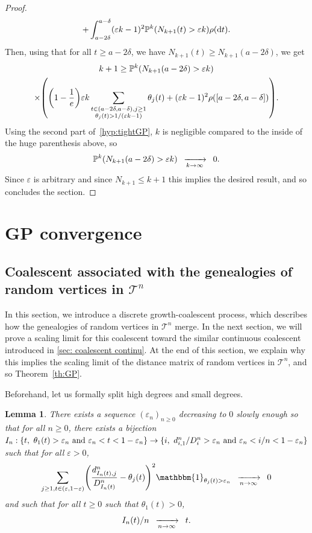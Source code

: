 \documentclass[10pt]{amsart}
\newtheorem{lemm}[theo]{Lemma}\newtheorem{prop}[theo]{Proposition}\newtheorem{coro}[theo]{Corollary}\newtheorem{conj}[theo]{Conjecture}
\theoremstyle{definition}\newtheorem{defi}[theo]{Definition}\newtheorem{rema}[theo]{Remark}\newtheorem{exam}[theo]{Example}\newtheorem{exem}[theo]{Example}\newtheorem{nota}[theo]{Notation}
\newcommand{\probak}[1]{\mathbb{P}^k\left(#1\right)}
\newcommand{\e}{\varepsilon}
\newcommand{\cv}[1][n]{\enskip\xrightarrow[#1 \to \infty]{}\enskip}
\newcommand{\rmd}{\mathrm{d}}
\newcommand{\1}{\mathbbm{1}}
\newcommand{\T}{\mathcal{T}}
\let\originalleft\left
\let\originalright\right
\renewcommand{\left}{\mathopen{}\mathclose\bgroup\originalleft}
\renewcommand{\right}{\aftergroup\egroup\originalright}
\renewcommand*{\to}{\mathchoice{\longrightarrow}{\rightarrow}{\rightarrow}{\rightarrow}}
\begin{document}
\begin{proof}
\begin{multline*}
+\int_{a-2\delta}^{a-\delta}(\e k-1)^2 \probak{N_{k+1}(t)>\e k}\rho(\rmd t).
\end{multline*}
Then, using that for all $t\geq a-2\delta$, we have $N_{k+1}(t)\geq N_{k+1}(a-2\delta)$, we get
\begin{multline*}
k+1 \geq \probak{N_{k+1}(a-2\delta)>\e k}\\
\times\left (\left(1-\frac{1}{e}\right){\e k} \sum_{\substack{ t\in (a-2\delta,a-\delta), j\geq 1 \\\theta_j(t)>1/(\e k-1) }} \theta_j(t)
+(\e k-1)^2\rho([a-2\delta,a-\delta]) \right).
\end{multline*}
Using the second part of~\ref{hyp:tightGP}, $k$ is negligible compared to the inside of the huge parenthesis above, so
\[
\probak{N_{k+1}(a-2\delta)>\e k}\cv[k] 0.
\]
Since $\e$ is arbitrary and since $N_{k+1}\leq k+1$ this implies the desired result, and so concludes the section.
\end{proof}



\section{GP convergence} \label{sec:proofGP}


\subsection{Coalescent associated with the genealogies of random vertices in \texorpdfstring{$\T^n$}{T\^n}}\label{sous-section coalescent discret}
In this section, we introduce a discrete growth-coalescent process, which describes how the genealogies of random vertices in $\T^n$ merge. In the next section, we will prove a scaling limit for this coalescent toward the similar continuous coalescent introduced in \cref{sec: coalescent continu}. At the end of this section, we explain why this implies the scaling limit of the distance matrix of random vertices in $\T^n$, and so Theorem~\ref{th:GP}.


Beforehand, let us formally split high degrees and small degrees.

\begin{lemm}\label{lemme epsilon n}
There exists a sequence $(\e_n)_{n\ge0}$ decreasing to $0$ slowly enough so that for all $n\ge 0$, there exists a bijection~$I_n : \{ t,\ \theta_1(t)>\e_n \text{ and } \e_n <t <1-\e_n \} \to
\{ i, \ d^n_{i,1}/D^n_i>\e_n \text{ and }
\e_n < i/n < 1-\e_n\}$ such that for all $\e>0$,
\begin{equation}\label{eq:cv atomes L2}
\sum_{j \ge 1, t\in (\e, 1-\e)}
\left(
\frac{d^n_{I_n(t), j}}{D^n_{I_n(t)}} - \theta_j(t)
\right)^2
\1_{\theta_j(t)>\e_n }
\cv[n] 0
\end{equation}
and such that for all $t\ge0$ such that $\theta_1(t)>0$,
\begin{equation}\label{eq: cv I sur n vers t}
I_n(t)/n \cv[n] t.
\end{equation}
\end{lemm}
\end{document}
